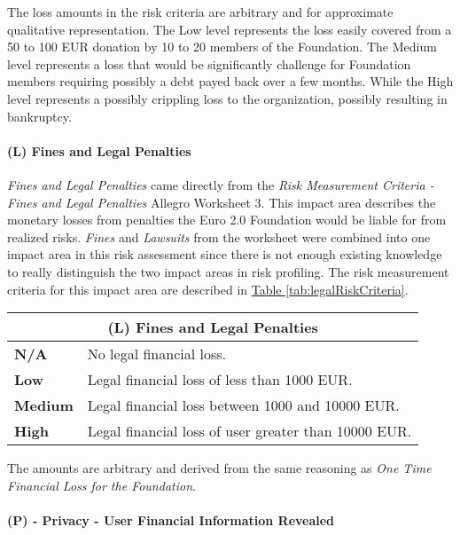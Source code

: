 \documentclass[12pt]{article} %
\newcommand{\hypertableref}[1]{\hyperref[#1]{Table \ref{#1}}}
\begin{document}
{The loss amounts in the risk criteria are arbitrary and for approximate qualitative representation. The Low level represents the loss easily covered from a 50 to 100 EUR donation by 10 to 20 members of the Foundation. The Medium level represents a loss that would be significantly challenge for Foundation members requiring possibly a debt payed back over a few months. While the High level represents a possibly crippling loss to the organization, possibly resulting in bankruptcy.

\paragraph{(L) Fines and Legal Penalties}

\textit{Fines and Legal Penalties} came directly from the \textit{Risk Measurement Criteria - Fines and Legal Penalties} Allegro Worksheet 3. This impact area describes the monetary losses from penalties the Euro 2.0 Foundation would be liable for from realized risks. \textit{Fines} and \textit{Lawsuits} from the worksheet were combined into one impact area in this risk assessment since there is not enough existing knowledge to really distinguish the two impact areas in risk profiling. The risk measurement criteria for this impact area are described in \hypertableref{tab:legalRiskCriteria}.

\begin{center}
\begin{tabular}{ | l | p{12cm} | }
  \hline
  \multicolumn{2}{|c|}{\textbf{(L) Fines and Legal Penalties}}
  \\ \hline
  \textbf{N/A} & No legal financial loss.
  \\ \hline
  \textbf{Low} & Legal financial loss of less than 1000 EUR.
  \\ \hline
  \textbf{Medium} & Legal financial loss between 1000 and 10000 EUR.
  \\ \hline
  \textbf{High} & Legal financial loss of user greater than 10000 EUR.
  \\ \hline
\end{tabular}
\end{center}
\label{tab:legalRiskCriteria}

The amounts are arbitrary and derived from the same reasoning as \textit{One Time Financial Loss for the Foundation}.

\paragraph{(P) - Privacy - User Financial Information Revealed}

}
\end{document}

